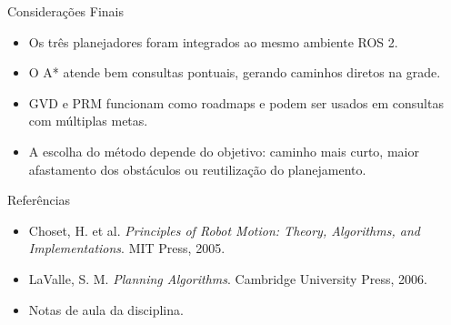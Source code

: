 \documentclass[aspectratio=169]{beamer}
\begin{document}
\begin{frame}{Considerações Finais}
    \begin{itemize}
        \item Os três planejadores foram integrados ao mesmo ambiente ROS 2.
        \item O A* atende bem consultas pontuais, gerando caminhos diretos na grade.
        \item GVD e PRM funcionam como roadmaps e podem ser usados em consultas com múltiplas metas.
        \item A escolha do método depende do objetivo: caminho mais curto, maior afastamento dos obstáculos ou reutilização do planejamento.
    \end{itemize}
\end{frame}

\begin{frame}{Referências}
    \small
    \begin{itemize}
        \item Choset, H. et al. \textit{Principles of Robot Motion: Theory, Algorithms, and Implementations}. MIT Press, 2005.
        \item LaValle, S. M. \textit{Planning Algorithms}. Cambridge University Press, 2006.
        \item Notas de aula da disciplina.
    \end{itemize}
\end{frame}
\end{document}
